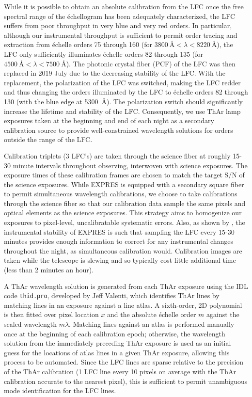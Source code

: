 While it is possible to obtain an absolute calibration from the LFC once the free spectral range of the \'echellogram has been adequately characterized, the LFC suffers from poor throughput in very blue and very red orders. In particular, although our instrumental throughput is sufficient to permit order tracing and extraction from \'echelle orders 75 through 160 (for $3800~\si{\angstrom}<\lambda<8220~\si{\angstrom}$), the LFC only sufficiently illuminates \'echelle orders 82 through 135 (for $4500~\si{\angstrom}<\lambda<7500~\si{\angstrom}$). The photonic crystal fiber (PCF) of the LFC was then replaced in 2019 July due to the decreasing stability of the LFC. With the replacement, the polarization of the LFC was switched, making the LFC redder and thus changing the orders illuminated by the LFC to \'echelle orders 82 through 130 (with the blue edge at 5300~\si{\angstrom}). The polarization switch should significantly increase the lifetime and stability of the LFC. Consequently, we use ThAr lamp exposures taken at the beginning and end of each night as a secondary calibration source to provide well-constrained wavelength solutions for orders outside the range of the LFC.

Calibration triplets (3 LFC's) are taken through the science fiber at roughly 15-30 minute intervals throughout observing, interwoven with science exposures. The exposure times of these calibration frames are chosen to match the target S/N of the science exposures. While EXPRES is equipped with a secondary square fiber to permit simultaneous wavelength calibrations, we choose to take calibrations through the science fiber so that our calibration data sample the same pixels and optical elements as the science exposures.  This strategy aims to homogenize our exposures to pixel-level, uncalibratable systematic errors. Also, as shown by \citet{blackman_performance_2020}, the instrumental stability of EXPRES is such that sampling the LFC every 15-30 minutes provides enough information to correct for any instrumental changes throughout the night, as simultaneous calibration would. Calibration images are taken while the telescope is slewing and so typically cost little additional time (less than 2 minutes an hour).

A ThAr wavelength solution is generated from each ThAr exposure using the IDL code \texttt{thid.pro}, developed by Jeff Valenti, which identifies ThAr lines by matching lines in an exposure against a line atlas. A sixth-order, 2D polynomial is then fitted over pixel location $x$ and the absolute \'echelle order $m$ against the scaled wavelength $m\lambda$. Matching lines against an atlas is performed manually once at the beginning of each calibration epoch; otherwise, the wavelength solution from the immediately preceding ThAr exposure is used as an initial guess for the locations of atlas lines in a given ThAr exposure, allowing this process to be automated. Since the LFC lines are sparse relative to the precision of the ThAr calibration (1 LFC line every 10 pixels on average with the ThAr calibration accurate to the nearest pixel), this is sufficient to permit unambiguous mode identification for the LFC lines.

